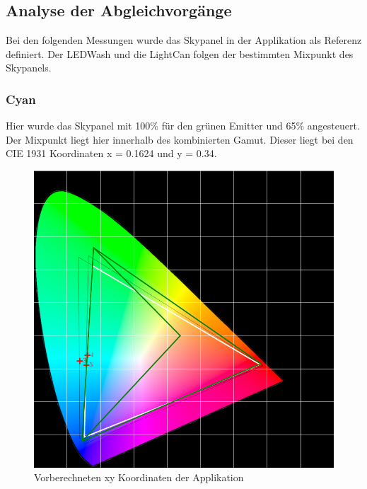 \documentclass[11pt]{scrartcl}
\begin{document}
\subsection{Analyse der Abgleichvorgänge}
Bei den folgenden Messungen wurde das Skypanel in der Applikation als Referenz definiert. Der LEDWash und die LightCan folgen der bestimmten Mixpunkt des Skypanels.
\subsubsection{Cyan}
Hier wurde das Skypanel mit 100\% für den grünen Emitter und 65\% angesteuert. Der Mixpunkt liegt hier innerhalb des kombinierten Gamut. Dieser liegt bei den
CIE 1931 Koordinaten x = 0.1624 und y = 0.34.
\begin{figure}[H]
    \begin{center}
        \includegraphics[width=.8\textwidth]{images/app_mix_cyan_cie.png}
    \end{center}
    \caption{Vorberechneten xy Koordinaten der Applikation}
\end{figure}
\noindent
\end{document}
